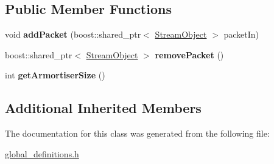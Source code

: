 \subsection*{Public Member Functions}
\begin{DoxyCompactItemize}
\item 
void {\bfseries add\+Packet} (boost\+::shared\+\_\+ptr$<$ \hyperlink{class_stream_object}{Stream\+Object} $>$ packet\+In)\hypertarget{class_spead2_rx_packet_wrapper_a27494b75b0a095215bda849698ff6b5b}{}\label{class_spead2_rx_packet_wrapper_a27494b75b0a095215bda849698ff6b5b}

\item 
boost\+::shared\+\_\+ptr$<$ \hyperlink{class_stream_object}{Stream\+Object} $>$ {\bfseries remove\+Packet} ()\hypertarget{class_spead2_rx_packet_wrapper_a134cc06cde331f923b3c543faf0cfabb}{}\label{class_spead2_rx_packet_wrapper_a134cc06cde331f923b3c543faf0cfabb}

\item 
int {\bfseries get\+Armortiser\+Size} ()\hypertarget{class_spead2_rx_packet_wrapper_a0926a3f53b1f6477a3a7ca4b726f2010}{}\label{class_spead2_rx_packet_wrapper_a0926a3f53b1f6477a3a7ca4b726f2010}

\end{DoxyCompactItemize}
\subsection*{Additional Inherited Members}


The documentation for this class was generated from the following file\+:\begin{DoxyCompactItemize}
\item 
\hyperlink{global__definitions_8h}{global\+\_\+definitions.\+h}\end{DoxyCompactItemize}
